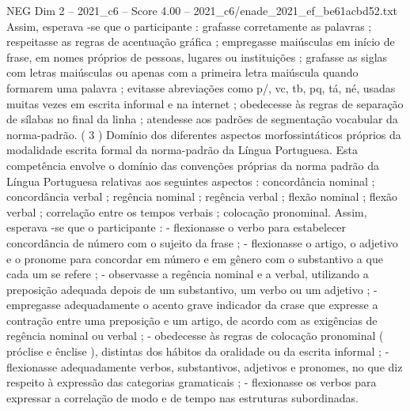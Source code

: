 \begin{textsample}{NEG Dim 2 – 2021\_c6 – Score 4.00 – 2021\_c6/enade\_2021\_ef\_be61acbd52.txt}
Assim, esperava -se que o participante : grafasse corretamente as palavras ; respeitasse as regras de acentuação gráfica ; empregasse maiúsculas em início de frase, em nomes próprios de pessoas, lugares ou instituições ; grafasse as siglas com letras maiúsculas ou apenas com a primeira letra maiúscula quando formarem uma palavra ; evitasse abreviações como p/, vc, tb, pq, tá, né, usadas muitas vezes em escrita informal e na internet ; obedecesse às regras de separação de sílabas no final da linha ; atendesse aos padrões de segmentação vocabular da norma-padrão. ( 3 ) Domínio dos diferentes aspectos morfossintáticos próprios da modalidade escrita formal da norma-padrão da Língua Portuguesa.
Esta competência envolve o domínio das convenções próprias da norma padrão da Língua Portuguesa relativas aos seguintes aspectos : concordância nominal ; concordância verbal ; regência nominal ; regência verbal ; flexão nominal ; flexão verbal ; correlação entre os tempos verbais ; colocação pronominal.
Assim, esperava -se que o participante : - flexionasse o verbo para estabelecer concordância de número com o sujeito da frase ; - flexionasse o artigo, o adjetivo e o pronome para concordar em número e em gênero com o substantivo a que cada um se refere ; - observasse a regência nominal e a verbal, utilizando a preposição adequada depois de um substantivo, um verbo ou um adjetivo ; - empregasse adequadamente o acento grave indicador da crase que expresse a contração entre uma preposição e um artigo, de acordo com as exigências de regência nominal ou verbal ; - obedecesse às regras de colocação pronominal ( próclise e ênclise ), distintas dos hábitos da oralidade ou da escrita informal ; - flexionasse adequadamente verbos, substantivos, adjetivos e pronomes, no que diz respeito à expressão das categorias gramaticais ; - flexionasse os verbos para expressar a correlação de modo e de tempo nas estruturas subordinadas.

\end{textsample}
